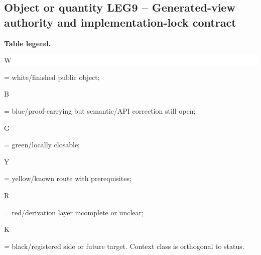 \subsection*{Object or quantity LEG9 -- Generated-view authority and implementation-lock contract}
\hypertarget{objproof:LEG9}{}
\par\smallskip\noindent\begin{minipage}{0.99\linewidth}\footnotesize\raggedright\textbf{Table legend.} \colorbox{white}{\strut W} = white/finished public object; \colorbox{cyan!20}{\strut B} = blue/proof-carrying but semantic/API correction still open; \colorbox{green!18}{\strut G} = green/locally closable; \colorbox{yellow!25}{\strut Y} = yellow/known route with prerequisites; \colorbox{red!20}{\strut R} = red/derivation layer incomplete or unclear; \colorbox{black!18}{\strut K} = black/registered side or future target. Context class is orthogonal to status.\end{minipage}\par\vspace{0.25em}
